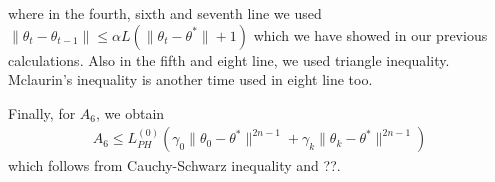 \documentclass[a4paper]{article}
\newcommand{\norm}[1]{\|#1 \|}
\newcommand{\thetastar}{\theta^*}
\newcommand{\constLPH}[1]{L_{PH}^{(#1)}}
\newcommand{\stepsize}{\alpha}
\begin{document}
	where in the fourth, sixth and seventh line we used $\norm{\theta_{t} - \theta_{t - 1}} \leq \stepsize L\left(\norm{\theta_{t} - \thetastar} + 1\right)$ which we have showed in our previous calculations. Also in the fifth and eight line, we used triangle inequality. Mclaurin's inequality is another time used in eight line too.
	
	Finally, for $A_{6}$, we obtain
	\begin{align*}
		A_{6} \leq \constLPH{0}\left(\gamma_{0}\norm{\theta_{0} - \thetastar}^{2n - 1} + \gamma_{k}\norm{\theta_{k} - \thetastar}^{2n - 1}\right)
	\end{align*}
	which follows from Cauchy-Schwarz inequality and ??.
	
	
	
\end{document}
